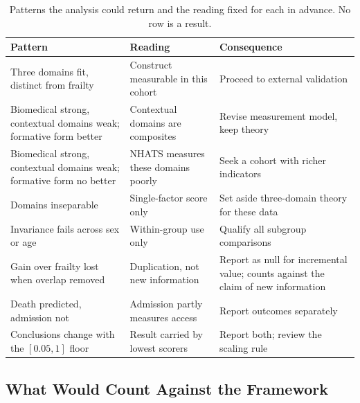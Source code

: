 \begin{table}[htbp]
\centering
\caption{Patterns the analysis could return and the reading fixed for each in advance. No row is a result.}
\label{tab:disc-patterns}
\footnotesize
\renewcommand{\arraystretch}{1.15}
\begin{tabular}{p{4.6cm} p{5.2cm} p{4.0cm}}
\toprule
\textbf{Pattern} & \textbf{Reading} & \textbf{Consequence} \\
\midrule
Three domains fit, distinct from frailty & Construct measurable in this cohort & Proceed to external validation \\
Biomedical strong, contextual domains weak; formative form better & Contextual domains are composites & Revise measurement model, keep theory \\
Biomedical strong, contextual domains weak; formative form no better & NHATS measures these domains poorly & Seek a cohort with richer indicators \\
Domains inseparable & Single-factor score only & Set aside three-domain theory for these data \\
Invariance fails across sex or age & Within-group use only & Qualify all subgroup comparisons \\
Gain over frailty lost when overlap removed & Duplication, not new information & Report as null for incremental value; counts against the claim of new information \\
Death predicted, admission not & Admission partly measures access & Report outcomes separately \\
Conclusions change with the $[0.05,1]$ floor & Result carried by lowest scorers & Report both; review the scaling rule \\
\bottomrule
\end{tabular}
\end{table}

\subsection{What Would Count Against the Framework}
\label{sec:disc-read-against}

